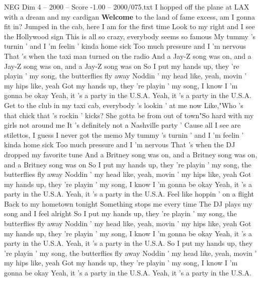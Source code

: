 \begin{textsample}{NEG Dim 4 – 2000 – Score -1.00 – 2000/075.txt}  \label{ex:f4_neg_032}
I hopped off the plane at LAX with a dream and my cardigan \textbf{Welcome} to the land of fame excess, am I gonna fit in?
Jumped in the cab, here I am for the first time Look to my right and I see the Hollywood sign This is all so crazy, everybody seems so famous My tummy 's turnin ' and I 'm feelin ' kinda home sick Too much pressure and I 'm nervous That 's when the taxi man turned on the radio And a Jay-Z song was on, and a Jay-Z song was on, and a Jay-Z song was on So I put my hands up, they 're playin ' my song, the butterflies fly away Noddin ' my head like, yeah, movin ' my hips like, yeah Got my hands up, they 're playin ' my song, I know I 'm gonna be okay Yeah, it 's a party in the U.S.A.
Yeah, it 's a party in the U.S.A.
Get to the club in my taxi cab, everybody 's lookin ' at me now Like,"Who 's that chick that 's rockin ' kicks?
She gotta be from out of town"So hard with my girls not around me It 's definitely not a Nashville party ' Cause all I see are stilettos, I guess I never got the memo My tummy 's turnin ' and I 'm feelin ' kinda home sick Too much pressure and I 'm nervous That 's when the DJ dropped my favorite tune And a Britney song was on, and a Britney song was on, and a Britney song was on So I put my hands up, they 're playin ' my song, the butterflies fly away Noddin ' my head like, yeah, movin ' my hips like, yeah Got my hands up, they 're playin ' my song, I know I 'm gonna be okay Yeah, it 's a party in the U.S.A.
Yeah, it 's a party in the U.S.A.
Feel like hoppin ' on a flight Back to my hometown tonight Something stops me every time The DJ plays my song and I feel alright So I put my hands up, they 're playin ' my song, the butterflies fly away Noddin ' my head like, yeah, movin ' my hips like, yeah Got my hands up, they 're playin ' my song, I know I 'm gonna be okay Yeah, it 's a party in the U.S.A.
Yeah, it 's a party in the U.S.A.
So I put my hands up, they 're playin ' my song, the butterflies fly away Noddin ' my head like, yeah, movin ' my hips like, yeah Got my hands up, they 're playin ' my song, I know I 'm gonna be okay Yeah, it 's a party in the U.S.A.
Yeah, it 's a party in the U.S.A.

\end{textsample}
